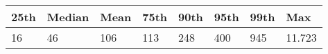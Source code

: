 \begin{tabular}{llllllll}
  25th & Median & Mean & 75th & 90th & 95th & 99th & Max\\
  \hline
  \hline
  16 & 46 & 106 & 113 & 248 & 400 & 945 & 11.723\\
  
\end{tabular}
